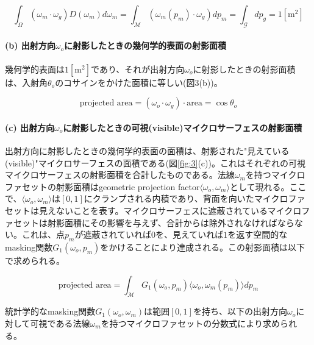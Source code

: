 \documentclass[a4j,xelatex,ja=standard]{bxjsarticle}
\begin{document}
\begin{equation}
    \int_\Omega (\omega_m \cdot \omega_g) D(\omega_m) d\omega_m = \int_\mathcal{M} (\omega_m(p_m) \cdot \omega_g) dp_m = \int_\mathcal{G} dp_g = 1 [\text{m}^2]
    \label{eq:9}
\end{equation}

\paragraph{(b) 出射方向$\omega_o$に射影したときの幾何学的表面の射影面積}

幾何学的表面は$1 [\text{m}^2]$であり、それが出射方向$\omega_o$に射影したときの射影面積は、入射角$\theta_o$のコサインをかけた面積に等しい(図3(b))。

\begin{equation}
    \text{projected area} = (\omega_o \cdot \omega_g) \cdot \text{area} = \cos \theta_o
    \label{eq:10}
\end{equation}

\paragraph{(c) 出射方向$\omega_o$に射影したときの可視(visible)マイクロサーフェスの射影面積}

出射方向に射影したときの幾何学的表面の面積は、射影された"見えている(visible)"マイクロサーフェスの面積である(図\ref{fig:3}(c))。これはそれぞれの可視マイクロサーフェスの射影面積を合計したものである。法線$\omega_m$を持つマイクロファセットの射影面積はgeometric projection factor$\langle \omega_o, \omega_m \rangle$として現れる。ここで、$\langle \omega_o, \omega_m \rangle$は$[0, 1]$にクランプされる内積であり、背面を向いたマイクロファセットは見えないことを表す。マイクロサーフェスに遮蔽されているマイクロファセットは射影面積にその影響を与えず、合計からは除外されなければならない。これは、点$p_m$が遮蔽されていれば$0$を、見えていれば$1$を返す空間的なmasking関数$G_1(\omega_o, p_m)$をかけることにより達成される。この射影面積は以下で求められる。

\begin{equation}
    \text{projected area} = \int_\mathcal{M} G_1(\omega_o, p_m) \langle \omega_o, \omega_m(p_m) \rangle dp_m
    \label{eq:11}
\end{equation}

統計学的なmasking関数$G_1(\omega_o, \omega_m)$は範囲$[0, 1]$を持ち、以下の出射方向$\omega_o$に対して可視である法線$\omega_m$を持つマイクロファセットの分数式により求められる。
\end{document}
